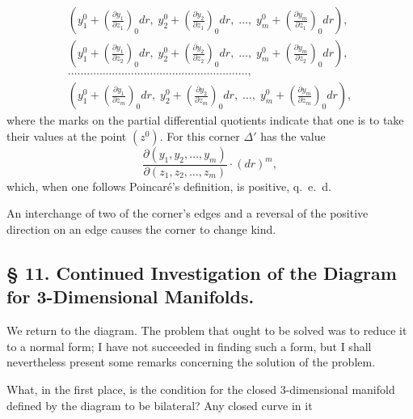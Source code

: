 \documentclass{article}
\begin{document}
\[
\begin{gathered}
\left(y_1^0 + \left(\frac{\partial y_1}{\partial z_1}\right)_0 dr, \; y_2^0 + \left(\frac{\partial y_2}{\partial z_1}\right)_0 dr, \; \dots, \; y_m^0 + \left(\frac{\partial y_m}{\partial z_1}\right)_0 dr\right), \\
\left(y_1^0 + \left(\frac{\partial y_1}{\partial z_2}\right)_0 dr, \; y_2^0 + \left(\frac{\partial y_2}{\partial z_2}\right)_0 dr, \; \dots, \; y_m^0 + \left(\frac{\partial y_m}{\partial z_2}\right)_0 dr\right), \\
\dots\dots\dots\dots\dots\dots\dots\dots\dots\dots\dots\dots\dots\dots\dots\dots\dots\dots\dots, \\
\left(y_1^0 + \left(\frac{\partial y_1}{\partial z_m}\right)_0 dr, \; y_2^0 + \left(\frac{\partial y_2}{\partial z_m}\right)_0 dr, \; \dots, \; y_m^0 + \left(\frac{\partial y_m}{\partial z_m}\right)_0 dr\right),
\end{gathered}
\]
where the marks on the partial differential quotients indicate that one is to take their values at the point $(z^0)$. For this corner $\Delta'$ has the value
\[
\frac{\partial(y_1, y_2, \dots, y_m)}{\partial(z_1, z_2, \dots, z_m)} \cdot (dr)^m,
\]
which, when one follows Poincaré's definition, is positive, q.~e.~d.

An interchange of two of the corner's edges and a reversal of the positive direction on an edge causes the corner to change kind.

\subsection*{§ 11. Continued Investigation of the Diagram for 3-Dimensional Manifolds.}

We return to the diagram. The problem that ought to be solved was to reduce it to a normal form; I have not succeeded in finding such a form, but I shall nevertheless present some remarks concerning the solution of the problem.

What, in the first place, is the condition for the closed 3-dimensional manifold defined by the diagram to be bilateral? Any closed curve in it
\end{document}
